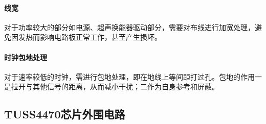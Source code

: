 \paragraph{线宽}
对于功率较大的部分如电源、超声换能器驱动部分，需要对布线进行加宽处理，避免因发热而影响电路板正常工作，甚至产生损坏。\par
\paragraph{时钟包地处理}
对于速率较低的时钟，需进行包地处理，即在地线上等间距打过孔。包地的作用一是拉开与其他信号的距离，从而减小干扰；二作为自身参考和屏蔽。

\newpage
\subsection{TUSS4470芯片外围电路}


